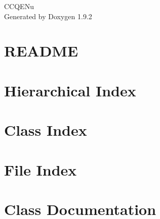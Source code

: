 \documentclass[twoside]{book}
\newcommand{\+}{\discretionary{\mbox{\scriptsize$\hookleftarrow$}}{}{}}
\newcommand{\clearemptydoublepage}{%
    \newpage{\pagestyle{empty}\cleardoublepage}%
  }
\begin{document}
  \raggedbottom
    \hypersetup{pageanchor=false,
                bookmarksnumbered=true,
                pdfencoding=unicode
               }
  \begin{titlepage}
  \vspace*{7cm}
  \begin{center}%
  {\Large CCQENu}\\
  \vspace*{1cm}
  {\large Generated by Doxygen 1.9.2}\\
  \end{center}
  \end{titlepage}
  \clearemptydoublepage
  \tableofcontents
  \clearemptydoublepage
  \hypersetup{pageanchor=true}
\chapter{README}
\label{md_make_hists_doc__r_e_a_d_m_e}

\chapter{Hierarchical Index}

\chapter{Class Index}

\chapter{File Index}

\chapter{Class Documentation}


























\end{document}

